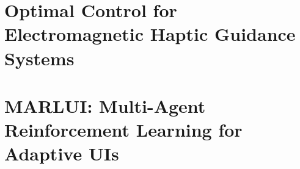 \documentclass[../../main.tex]{subfiles}
\begin{document}
\def\dir{chapters/appendix}

\chapter{Optimal Control for Electromagnetic Haptic Guidance Systems}
\label{app:dipoledipole}


\chapter{MARLUI: Multi-Agent Reinforcement Learning for Adaptive UIs}
\def\dir{chapters/05_shared_control/rl}

\end{document}
